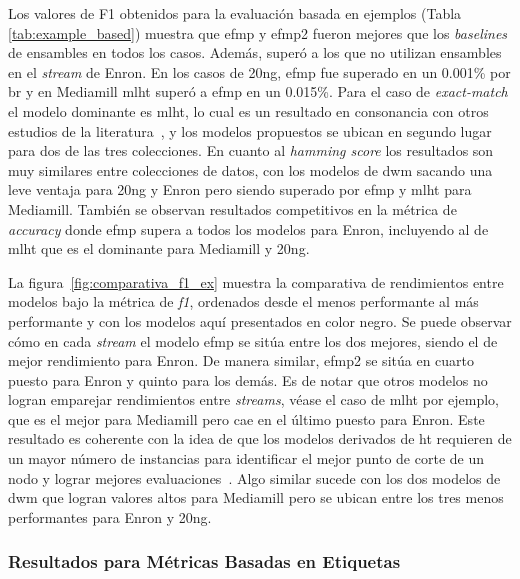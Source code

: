 Los valores de F1 obtenidos para la evaluación basada en ejemplos (Tabla
\ref{tab:example_based}) muestra que \acrshort{efmp} y \acrshort{efmp2} fueron
mejores que los \textit{baselines} de ensambles en todos los casos.  Además,
superó a los que no utilizan ensambles en el \textit{stream} de Enron.  En los
casos de 20ng, \acrshort{efmp} fue superado en un 0.001\% por \acrshort{br} y en
Mediamill \acrshort{mlht} superó a \acrshort{efmp} en un 0.015\%. Para el caso
de \textit{exact-match} el modelo dominante es \acrshort{mlht}, lo cual es un
resultado en consonancia con otros estudios de la
literatura~\cite{read_scalable_2012,osojnik_multi-label_2017,zheng_survey_2020},
y los modelos propuestos se ubican en segundo lugar para dos de las tres
colecciones. En cuanto al \textit{hamming score} los resultados son muy
similares entre colecciones de datos, con los modelos de \acrshort{dwm} sacando
una leve ventaja para 20ng y Enron pero siendo superado por \acrshort{efmp} y
\acrshort{mlht} para Mediamill. También se observan resultados competitivos en
la métrica de \textit{accuracy} donde \acrshort{efmp} supera a todos los modelos
para Enron, incluyendo al de \acrshort{mlht} que es el dominante para Mediamill
y 20ng.

La figura~\ref{fig:comparativa_f1_ex} muestra la comparativa de rendimientos
entre modelos bajo la métrica de \textit{f1}, ordenados desde el menos
performante al más performante y con los modelos aquí presentados en color
negro. Se puede observar cómo en cada \textit{stream} el modelo \acrshort{efmp}
se sitúa entre los dos mejores, siendo el de mejor rendimiento para Enron. De
manera similar, \acrshort{efmp2} se sitúa en cuarto puesto para Enron y quinto
para los demás. Es de notar que otros modelos no logran emparejar rendimientos
entre \textit{streams}, véase el caso de \acrshort{mlht} por ejemplo, que es el
mejor para Mediamill pero cae en el último puesto para Enron. Este resultado es
coherente con la idea de que los modelos derivados de \acrlong{ht} requieren de
un mayor número de instancias para identificar el mejor punto de corte de un
nodo y lograr mejores evaluaciones~\cite{read_scalable_2012}. Algo similar
sucede con los dos modelos de \acrshort{dwm} que logran valores altos para
Mediamill pero se ubican entre los tres menos performantes para Enron y 20ng.

\subsubsection{Resultados para Métricas Basadas en Etiquetas}

